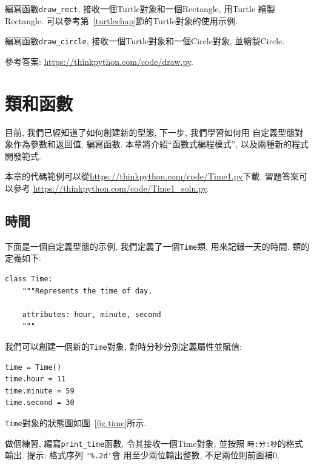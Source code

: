 \documentclass[10pt]{book}
\begin{document}
\begin{exercise}

編寫函數\verb"draw_rect", 接收一個Turtle對象和一個Rectangle, 
用Turtle 繪製Rectangle. 
可以參考第~\ref{turtlechap}節的Turtle對象的使用示例. 

編寫函數\verb"draw_circle",  接收一個Turtle對象和一個Circle對象, 並繪製Circle.


參考答案: \url{https://thinkpython.com/code/draw.py}.

\end{exercise}



\chapter{類和函數}
\label{time}

目前, 我們已經知道了如何創建新的型態, 下一步, 我們學習如何用
自定義型態對象作為參數和返回值, 編寫函數. 
本章將介紹``函數式編程模式'', 以及兩種新的程式開發範式. 


本章的代碼範例可以從\url{https://thinkpython.com/code/Time1.py}下載. 
習題答案可以參考
\url{https://thinkpython.com/code/Time1_soln.py}.


\section{時間}
\label{isafter}

下面是一個自定義型態的示例, 我們定義了一個{\tt Time}類, 
用來記錄一天的時間. 
類的定義如下: 
 

\begin{verbatim}
class Time:
    """Represents the time of day.
       
    attributes: hour, minute, second
    """
\end{verbatim}
%
我們可以創建一個新的{\tt Time}對象, 
對時分秒分別定義屬性並賦值:

\begin{verbatim}
time = Time()
time.hour = 11
time.minute = 59
time.second = 30
\end{verbatim}
%
{\tt Time}對象的狀態圖如圖~\ref{fig.time}所示.

做個練習, 編寫\verb"print_time"函數, 令其接收一個Time對象, 並按照
{\tt 時:分:秒}的格式輸出. 
提示: 格式序列 \verb"'%.2d'"會
用至少兩位輸出整數, 不足兩位則前面補0. 
\end{document}
